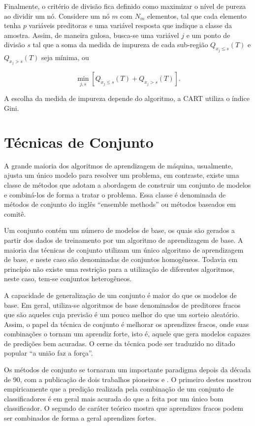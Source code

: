 Finalmente, o critério de divisão fica definido como maximizar o nível de pureza ao dividir um nó. Considere um nó $m$ com $N_m$ elementos, tal que cada elemento tenha $p$ variáveis preditoras e uma variável resposta que indique a classe da amostra. Assim, de maneira gulosa, busca-se uma variável $j$ e um ponto de divisão $s$ tal que a soma da medida de impureza de cada sub-região $Q_{x_j\le{s}}(T)$ e $Q_{x_j>{s}}(T)$ seja mínima, ou

\begin{equation}
\min_{j,s}\left[Q_{x_j\le{s}}(T)+Q_{x_j>{s}}(T)\right]\mbox{.}
\end{equation}

A escolha da medida de impureza depende do algoritmo, a CART utiliza o índice Gini.

\section{Técnicas de Conjunto}

A grande maioria dos algoritmos de aprendizagem de máquina, usualmente, ajusta um único modelo para resolver um problema, em contraste, existe uma classe de métodos que adotam a abordagem de construir um conjunto de modelos e combiná-los de forma a tratar o problema. Essa classe é denominada de métodos de conjunto do inglês ``ensemble methods'' ou métodos baseados em comitê.

Um conjunto contém um número de modelos de base, os quais são gerados a partir dos dados de treinamento por um algoritmo de aprendizagem de base. A maioria das técnicas de conjunto utilizam um único algoritmo de aprendizagem de base, e neste caso são denominadas de conjuntos homogêneos. Todavia em princípio não existe uma restrição para a utilização de diferentes algoritmos, neste caso, tem-se conjuntos heterogêneos.


A capacidade de generalização de um conjunto é maior do que os modelos de base. Em geral, utiliza-se algoritmos de base denominados de preditores fracos que são aqueles cuja previsão é um pouco melhor do que um sorteio aleatório. Assim, o papel da técnica de conjunto é melhorar os aprendizes fracos, onde suas combinações o tornam um aprendiz forte, isto é, aquele que gera modelos capazes de predições bem acuradas. O cerne da técnica pode ser traduzido no ditado popular ``a união faz a força''.

Os métodos de conjunto se tornaram um importante paradigma depois da década de 90, com a publicação de dois trabalhos pioneiros \cite{HANSEN:1990} e \cite{SCHAPIRE:1990}. O primeiro destes mostrou empiricamente que a predição realizada pela combinação de um conjunto de classificadores é em geral mais acurada do que a feita por um único bom classificador. O segundo de caráter teórico mostra que aprendizes fracos podem ser combinados de forma a geral aprendizes fortes.

